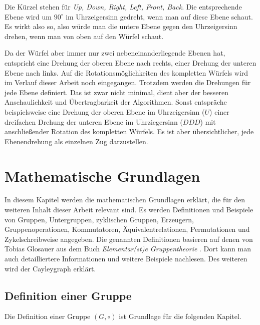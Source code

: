 \documentclass[12pt,a4paper, usenames, dvipsnames]{article}
\theoremstyle{mystyle}
\theoremstyle{definition}
\begin{document}
Die Kürzel stehen für \textit{Up, Down, Right, Left, Front, Back}. 
Die entsprechende Ebene wird um $90^\circ$ im Uhrzeigersinn gedreht, wenn man auf diese Ebene schaut. Es wirkt also so, also würde man die untere Ebene gegen den Uhrzeigersinn drehen, wenn man von oben auf den Würfel schaut.  


Da der Würfel aber immer nur zwei nebeneinanderliegende Ebenen hat, entspricht eine Drehung der oberen Ebene nach rechts, einer Drehung der unteren Ebene nach links. 
Auf die Rotationsmöglichkeiten des kompletten Würfels wird im Verlauf dieser Arbeit noch eingegangen. Trotzdem werden die Drehungen für jede Ebene definiert. Das ist zwar nicht minimal, dient aber der besseren Anschaulichkeit und Übertragbarkeit der Algorithmen.
Sonst entspräche beispielsweise eine Drehung der oberen Ebene im Uhrzeigersinn ($U$) einer dreifachen Drehung der unteren Ebene im Uhrziegersinn ($DDD$) mit anschließender Rotation des kompletten Würfels. Es ist aber übersichtlicher, jede Ebenendrehung als einzelnen Zug darzustellen.



%
%
%
%
%
%
%
%
%
%
%
%
%
%
%
%
%


\newpage
\section{Mathematische Grundlagen}

In diesem Kapitel werden die mathematischen Grundlagen erklärt, die für den weiteren Inhalt dieser Arbeit relevant sind. Es werden Definitionen und Beispiele von Gruppen, Untergruppen, zyklischen Gruppen, Erzeugern, Gruppenoperationen, Kommutatoren, Äquivalentrelationen, Permutationen und Zykelschreibweise angegeben.
Die genannten Definitionen basieren auf denen von Tobias Glosauer aus dem Buch \textit{Elementar(st)e Gruppentheorie} \cite{Buch}. Dort kann man auch detailliertere Informationen und weitere Beispiele nachlesen.
Des weiteren wird der Cayleygraph erklärt. 
%
%
%
%
%
%
\subsection*{Definition einer Gruppe} 


Die Definition einer Gruppe $(G, \circ)$ ist Grundlage für die folgenden Kapitel. 
\end{document}
